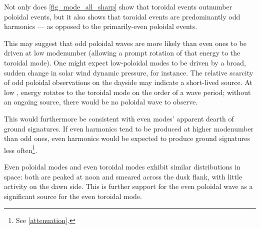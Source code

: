 Not only does \cref{fig_mode_all_sharp} show that toroidal events outnumber poloidal events, but it also shows that toroidal events are predominantly odd harmonics --- as opposed to the primarily-even poloidal events. 








This may suggest that odd poloidal waves are more likely than even ones to be driven at low modenumber (allowing a prompt rotation of that energy to the toroidal mode). One might expect low-\azm poloidal modes to be driven by a broad, sudden change in solar wind dynamic pressure, for instance. The relative scarcity of odd poloidal observations on the dayside may indicate a short-lived source. At low \azm, energy rotates to the toroidal mode on the order of a wave period; without an ongoing source, there would be no poloidal wave to observe. 







This would furthermore be consistent with even modes' apparent dearth of ground signatures\cite{takahashi_1992}. If even harmonics tend to be produced at higher modenumber than odd ones, even harmonics would be expected to produce ground signatures less often\footnote{See \cref{attenuation}. }. 

Even poloidal modes and even toroidal modes exhibit similar distributions in space: both are peaked at noon and smeared across the dusk flank, with little activity on the dawn side. This is further support for the even poloidal wave as a significant source for the even toroidal mode. 


